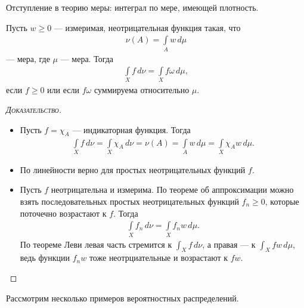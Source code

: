 
Отступление в теорию меры: интеграл по мере, имеющей плотность.

\begin{thm}[%
]
 Пусть $ w \geqslant 0 $ --- измеримая, неотрицательная функция такая, что
 \begin{align*}
  \nu(A) = \int\limits_{A} w\,d\mu 
 \end{align*} --- мера, где $ \mu $ --- мера. Тогда
 \begin{align*}
  \int\limits_{X} f\,d\nu = \int\limits_{X} f \omega \, d\mu,
 \end{align*} если $ f \geqslant 0 $ или если $ f\omega $ суммируема относительно $ \mu $.
\end{thm}
\begin{proof}[\normalfont\textsc{Доказательство}]\
 \begin{itemize}
  \item Пусть $ f = \chi_A $ --- индикаторная функция. Тогда
   \begin{align*}
    \int\limits_{X} f\, d\nu = \int\limits_{X} \chi_A \, d\nu = \nu(A) = \int\limits_{A} w\,d\mu = \int\limits_{X} \chi_A w\,d\mu.    
   \end{align*} 
  \item По линейности верно для простых неотрицательных функций $ f $.
  \item Пусть $ f $ неотрицательна и измерима. По теореме об аппроксимации можно взять последовательных простых неотрицательных функций $ f_n \geqslant 0 $, которые поточечно возрастают к $ f $. Тогда
   \begin{align*}
    \int\limits_{X} f_n \,d\nu = \int\limits_{X} f_n w \,d\mu.  
   \end{align*} По теореме Леви левая часть стремится к $ \int_{X} f\,d\nu  $, а правая --- к $ \int_{X} fw\,d\mu $, ведь функции $ f_nw $ тоже неотрциательные и возрастают к $ fw $.
 \end{itemize}
\end{proof}

Рассмотрим несколько примеров вероятностных распределений.

